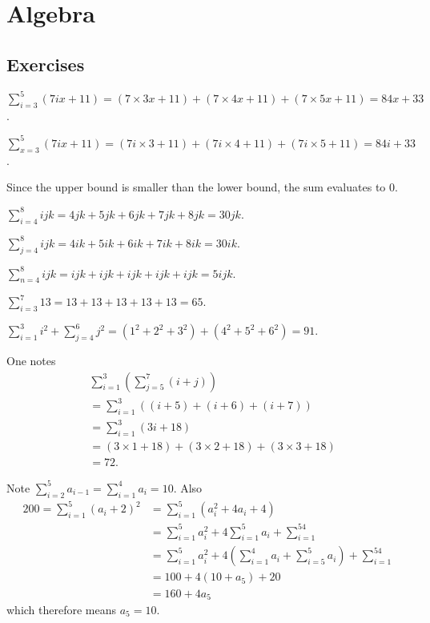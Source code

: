 \section{Algebra}
\subsection*{Exercises}
\begin{questions}
    \item \begin{partquestions}{\alph*}
        \item $\displaystyle \sum_{i=3}^{5}(7ix+11) = (7\times3x + 11) + (7\times4x + 11) + (7\times5x + 11) = 84x + 33$.
        \item $\displaystyle \sum_{x=3}^{5}(7ix+11) = (7i\times3 + 11) + (7i\times4 + 11) + (7i\times5 + 11) = 84i + 33$.
        \item Since the upper bound is smaller than the lower bound, the sum evaluates to 0.
        \item $\displaystyle \sum_{i=4}^{8}ijk = 4jk + 5jk + 6jk + 7jk + 8jk = 30jk$.
        \item $\displaystyle \sum_{j=4}^{8}ijk = 4ik + 5ik + 6ik + 7ik + 8ik = 30ik$.
        \item $\displaystyle \sum_{n=4}^{8}ijk = ijk + ijk + ijk + ijk + ijk = 5ijk$.
        \item $\displaystyle \sum_{i=3}^{7}13 = 13 + 13 + 13 + 13 + 13 = 65$.
        \item $\displaystyle \sum_{i=1}^{3}i^2 + \sum_{j=4}^{6}j^2 = (1^2 + 2^2 + 3^2) + (4^2 + 5^2 + 6^2) = 91$.
        \item One notes
        \begin{align*}
            &\sum_{i=1}^{3}\left(\sum_{j=5}^{7}(i+j)\right)\\
            &= \sum_{i=1}^{3}\left((i+5) + (i+6) + (i+7)\right)\\
            &= \sum_{i=1}^{3}\left(3i+18\right)\\
            &= (3\times1 + 18) + (3\times2 + 18) + (3\times3 + 18)\\
            &= 72.
        \end{align*}
    \end{partquestions}

    \item Note $\displaystyle \sum_{i=2}^5a_{i-1} = \sum_{i=1}^4a_i = 10$. Also
    \begin{align*}
        200 = \sum_{i=1}^5(a_i+2)^2 &= \sum_{i=1}^5(a_i^2 + 4a_i + 4)\\
        &= \sum_{i=1}^5a_i^2 + 4\sum_{i=1}^5a_i + \sum_{i=1}^54\\
        &= \sum_{i=1}^5a_i^2 + 4\left(\sum_{i=1}^4a_i + \sum_{i=5}^5a_i\right) + \sum_{i=1}^54\\
        &= 100 + 4\left(10 + a_5\right) + 20\\
        &= 160 + 4a_5
    \end{align*}
    which therefore means $a_5 = 10$.


\end{questions}
